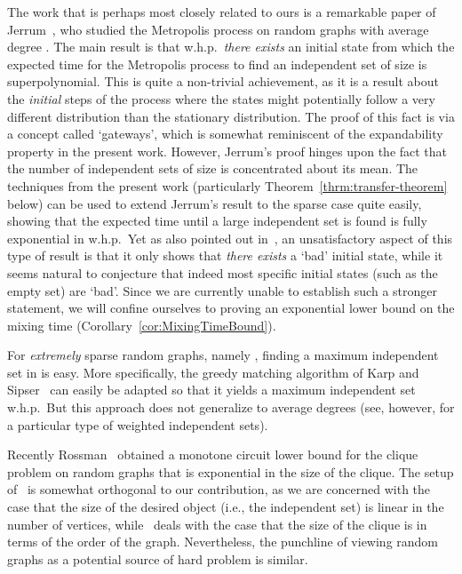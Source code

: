 \documentclass[a4paper,10pt]{article}
\newcommand{\whp}{w.h.p.}
\newcommand\Thm{Theorem}
\newcommand\Cor{Corollary}
\begin{document}
The work that is perhaps most closely related to ours is  a remarkable
paper of Jerrum~\cite{jerrum-planted}, who studied the Metropolis
process on random graphs  with average degree .
The main result is that \whp\  \emph{there exists} an initial
state from which the expected time for the Metropolis process to
find an independent set of size  is
superpolynomial.
This is quite a non-trivial achievement, as it is a result about the
\emph{initial} steps of the process where the states might potentially
follow a very different distribution than the stationary distribution.
The proof of this fact is via a concept called `gateways', which is
somewhat reminiscent of the expandability property in the present work.
However, Jerrum's proof hinges upon the fact that the number of
independent sets of size  is
concentrated about its mean. The techniques from the present work
(particularly \Thm~\ref{thrm:transfer-theorem} below) can be used
to extend Jerrum's result to the sparse case quite easily, showing
that the expected time until a large independent set is found is fully
exponential in  \whp\ Yet as also pointed out in~\cite{jerrum-planted},
an unsatisfactory aspect of this type of result is that it only shows that
\emph{there exists} a `bad' initial state, 	while it seems natural to
conjecture that indeed most specific initial states (such as the empty set)
are `bad'. Since we are currently unable to establish such a
stronger statement, we will confine ourselves to proving an exponential
lower bound on the mixing time (\Cor~\ref{cor:MixingTimeBound}).



For \emph{extremely} sparse random graphs, namely ,
finding a maximum independent set in  is easy. More
specifically, the greedy matching algorithm of Karp and
Sipser~\cite{KarpSipser} can easily be adapted so that it
yields a maximum independent set \whp\ But this approach does
not generalize to average degrees  (see, however,
\cite{Gamarnik} for a particular type of weighted independent
sets).



Recently Rossman~\cite{monotone-circuit} obtained a monotone circuit
lower bound for the clique problem on random graphs that is exponential
in the size of the clique. The setup of~\cite{monotone-circuit} is
somewhat orthogonal to our contribution, as we are concerned with the
case that the size of the desired object (i.e., the independent set)
is linear in the number of vertices, while~\cite{monotone-circuit}
deals with the case that the size of the clique is  in terms
of the order of the graph. Nevertheless, the punchline of viewing
random graphs as a potential source of hard problem is similar.
\end{document}
